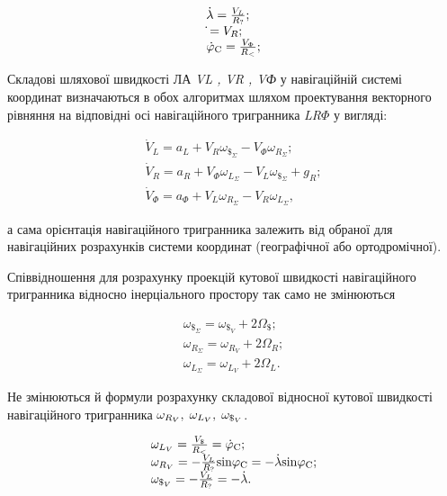 \[\begin{array}{l} 
{\dot{\lambda }=\frac{V_{L} }{R_{{\rm ?}} } ;} \\ {\dot{}=V_{R} ;} \\ {\dot{\varphi 
}_{{\rm C}} =\frac{V_{\Phi } }{R_{{\rm <}} } ;} \end{array}\] 

Складові шляхової швидкості ЛА  \textit{VL , VR , VФ} у навігаційній системі координат 
визначаються  в обох алгоритмах шляхом проектування векторного рівняння на відповідні 
осі навігаційного тригранника \textit{LR$\Phi $} у вигляді:

\[\begin{array}{l} {\dot{V}_{L} =a_{L} +V_{R} \omega_{\$_{\Sigma } } -V_{\Phi } 
\omega_{R_{\Sigma } } ;} \\ {\dot{V}_{R} =a_{R} +V_{\Phi } \omega_{L_{\Sigma } 
} -V_{L} \omega_{\$_{\Sigma } } +g_{R} ;} \\ {\dot{V}_{\Phi } =a_{\Phi } +V_{L} 
\omega_{R_{\Sigma } } -V_{R} \omega_{L_{\Sigma } } ,} \end{array}\] 

а сама орієнтація навігаційного тригранника залежить від обраної для навігаційних 
розрахунків системи координат (географічної або ортодромічної). 

Співвідношення для розрахунку проекцій кутової швидкості навігаційного тригранника 
відносно інерціального простору так само не змінюються

\[\begin{array}{l} {\omega_{\$_{\Sigma } } =\omega_{\$_{V} } +2\Omega_{\$ } 
;} \\ {\omega_{R_{\Sigma } } =\omega_{R_{V} } +2\Omega_{R} ;} \\ {\omega_{L_{
\Sigma } } =\omega_{L_{V} } +2\Omega_{L} .} \end{array}\] 

Не змінюються й формули розрахунку складової відносної кутової швидкості навігаційного 
тригранника $\omega_{R_{V} } ,{\rm \; }\omega_{L_{V} } ,{\rm \; }\omega_{\$_{V} 
} $.

\[
\begin{array}{l} 
{\omega_{L_{V} } =\frac{V_{\$ } }{R_{{\rm <}} } =\dot{\varphi }_{{\rm C}} ;} \\ 
{\omega_{R_{V}} =-\frac{V_{L} }{R_{{\rm ?}} } {\rm sin}\varphi 
_{{\rm C}} =-\dot{\lambda }{\rm sin}\varphi_{{\rm C}} ;} \\ 
{\omega_{\$_{V} } =-\frac{V_{L} }{R_{{\rm ?}} } =-\dot{\lambda }.} \end{array}\] 

